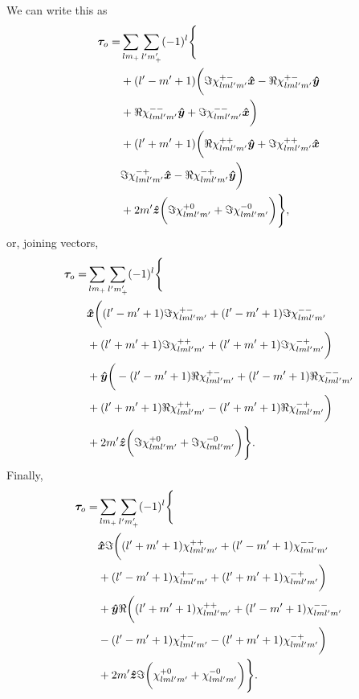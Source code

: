 \documentclass[aps,twocolumn,secnumarabic,balancelastpage,amsmath,amssymb,nofootinbib,floatfix]{revtex4-1}
\begin{document}
We can write this as
\begin{equation*}
\begin{aligned}
\bm \tau_o = &\sum_{lm_+}\sum_{l'm'_+}(-1)^l\Bigg\{\\
&+(l'-m'+1)\bigg(\Im\chi_{lml'm'}^{+-}\bm{\hat x} - \Re\chi_{lml'm'}^{+-}\bm{\hat y}\\
&+\Re\chi_{lml'm'}^{--}\bm{\hat y} + \Im\chi_{lml'm'}^{--}\bm{\hat x} \bigg)\\
&+(l'+m'+1)\bigg(\Re\chi_{lml'm'}^{++}\bm{\hat y} + \Im\chi_{lml'm'}^{++}\bm{\hat x}\\
&\Im\chi_{lml'm'}^{-+}\bm{\hat x} - \Re\chi_{lml'm'}^{-+}\bm{\hat y}\bigg)\\
&+2m'\bm{\hat z}\bigg(\Im\chi_{lml'm'}^{+0}+\Im\chi_{lml'm'}^{-0}\bigg)\Bigg\},
\end{aligned}
\end{equation*}
or, joining vectors,
\begin{equation*}
\begin{aligned}
\bm \tau_o = &\sum_{lm_+}\sum_{l'm'_+}(-1)^l\Bigg\{\\
&\bm{\hat x} \bigg((l'-m'+1)\Im\chi_{lml'm'}^{+-} + (l'-m'+1)\Im\chi_{lml'm'}^{--}\\
&+(l'+m'+1)\Im\chi_{lml'm'}^{++} + (l'+m'+1)\Im\chi_{lml'm'}^{-+}\bigg)\\
&+\bm{\hat y} \bigg(-(l'-m'+1)\Re\chi_{lml'm'}^{+-} + (l'-m'+1)\Re\chi_{lml'm'}^{--}\\
&+(l'+m'+1)\Re\chi_{lml'm'}^{++} - (l'+m'+1)\Re\chi_{lml'm'}^{-+}\bigg)\\
&+2m'\bm{\hat z}\bigg(\Im\chi_{lml'm'}^{+0}+\Im\chi_{lml'm'}^{-0}\bigg)\Bigg\}.
\end{aligned}
\end{equation*}
Finally,
\begin{equation*}
\begin{aligned}
\bm \tau_o = &\sum_{lm_+}\sum_{l'm'_+}(-1)^l\Bigg\{\\
&\bm{\hat x} \Im\bigg((l'+m'+1)\chi_{lml'm'}^{++}+ (l'-m'+1)\chi_{lml'm'}^{--}\\
&+ (l'-m'+1)\chi_{lml'm'}^{+-} + (l'+m'+1)\chi_{lml'm'}^{-+}\bigg)\\
&+\bm{\hat y} \Re\bigg((l'+m'+1)\chi_{lml'm'}^{++} + (l'-m'+1)\chi_{lml'm'}^{--} \\
&- (l'-m'+1)\chi_{lml'm'}^{+-} - (l'+m'+1)\chi_{lml'm'}^{-+}\bigg)\\
&+2m'\bm{\hat z}\Im\bigg(\chi_{lml'm'}^{+0}+\chi_{lml'm'}^{-0}\bigg)\Bigg\}.
\end{aligned}
\end{equation*}
\end{document}
